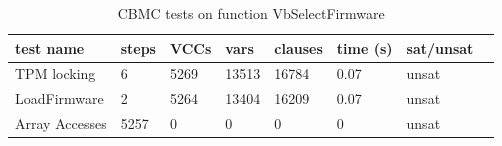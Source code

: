 \documentclass[../report.tex]{subfiles}
\begin{document}
\begin{table}[]
    \centering
    \caption{CBMC tests on function VbSelectFirmware}\label{sfw_results}
    \begin{tabular}{|l|l|l|l|l|l|l|l|}
        \hline
        test name & steps & VCCs & vars  & clauses & time (s) & sat/unsat  \\ \hline \hline
        TPM locking & 6 & 5269 & 13513 & 16784 & 0.07 & unsat \\ \hline
        LoadFirmware & 2 & 5264 & 13404 & 16209 & 0.07 & unsat \\ \hline
        Array Accesses & 5257 & 0 & 0 & 0 & 0 &  unsat \\ \hline
    \end{tabular}
\end{table}

\clearpage
\end{document}
